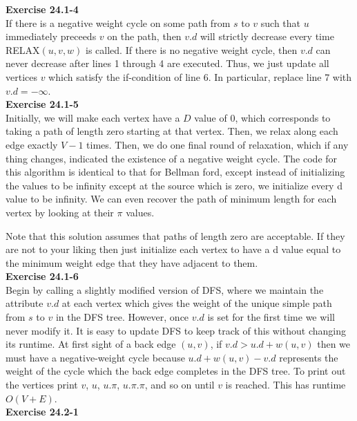 \documentclass{article}
\begin{document}
\noindent\textbf{Exercise 24.1-4}\\

If there is a negative weight cycle on some path from $s$ to $v$ such that $u$ immediately preceeds $v$ on the path, then $v.d$ will strictly decrease every time RELAX$(u,v,w)$ is called.  If there is no negative weight cycle, then $v.d$ can never decrease after lines 1 through 4 are executed.  Thus, we just update all vertices $v$ which satisfy the if-condition of line 6.  In particular, replace line 7 with $v.d = -\infty$.\\

\noindent\textbf{Exercise 24.1-5}\\

Initially, we will make each vertex have a $D$ value of 0, which corresponds to taking a path of length zero starting at that vertex. Then, we relax along each edge exactly $V-1$ times. Then, we do one final round of relaxation,  which if any thing changes, indicated the existence of a negative weight cycle. The code for this algorithm is identical to that for Bellman ford, except instead of initializing the values to be infinity except at the source which is zero, we initialize every d value to be infinity. We can even recover the path of minimum length for each vertex by looking at their $\pi$ values.

Note that this solution assumes that paths of length zero are acceptable. If they are not to your liking then just initialize each vertex to have a d value equal to the minimum weight edge that they have adjacent to them.\\

\noindent\textbf{Exercise 24.1-6}\\

Begin by calling a slightly modified version of DFS, where we maintain the attribute $v.d$ at each vertex which gives the weight of the unique simple path from $s$ to $v$ in the DFS tree.  However, once $v.d$ is set for the first time we will never modify it.  It is easy to update DFS to keep track of this without changing its runtime.  At first sight of a back edge $(u,v)$, if $v.d > u.d + w(u,v)$ then we must have a negative-weight cycle because $u.d + w(u,v) - v.d$ represents the weight of the cycle which the back edge completes in the DFS tree.  To print out the vertices print $v$, $u$, $u.\pi$, $u.\pi.\pi$, and so on until $v$ is reached.  This has runtime $O(V+E)$.  \\

\noindent\textbf{Exercise 24.2-1}\\
\end{document}
